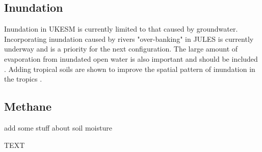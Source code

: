 \subsection{Inundation}
Inundation in UKESM is currently limited to that caused by groundwater. Incorporating inundation caused by rivers "over-banking" in JULES is currently underway  \citep{Dadson2010,Lewis2018} and is a priority for the next configuration. The large amount of evaporation from inundated open water is also important and should be included \citep{Dadson2010}. Adding tropical soils are shown to improve the spatial pattern of inundation in the tropics \citep{Gedney2019}.


\subsection{Methane}

add some stuff about soil moisture

\conclusions  %
TEXT